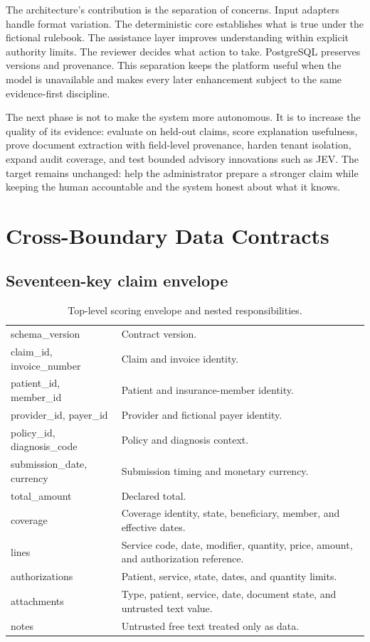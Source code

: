 \documentclass[11pt,a4paper,oneside]{report}
\begin{document}
The architecture's contribution is the separation of concerns. Input adapters handle format variation. The deterministic core establishes what is true under the fictional rulebook. The assistance layer improves understanding within explicit authority limits. The reviewer decides what action to take. PostgreSQL preserves versions and provenance. This separation keeps the platform useful when the model is unavailable and makes every later enhancement subject to the same evidence-first discipline.

The next phase is not to make the system more autonomous. It is to increase the quality of its evidence: evaluate on held-out claims, score explanation usefulness, prove document extraction with field-level provenance, harden tenant isolation, expand audit coverage, and test bounded advisory innovations such as JEV. The target remains unchanged: help the administrator prepare a stronger claim while keeping the human accountable and the system honest about what it knows.

\appendix
\chapter{Cross-Boundary Data Contracts}

\section{Seventeen-key claim envelope}

\begin{table}[H]
\centering
\begin{tabularx}{\textwidth}{>{\ttfamily}p{42mm} X}
\toprule
schema\_version & Contract version.\\
claim\_id, invoice\_number & Claim and invoice identity.\\
patient\_id, member\_id & Patient and insurance-member identity.\\
provider\_id, payer\_id & Provider and fictional payer identity.\\
policy\_id, diagnosis\_code & Policy and diagnosis context.\\
submission\_date, currency & Submission timing and monetary currency.\\
total\_amount & Declared total.\\
coverage & Coverage identity, state, beneficiary, member, and effective dates.\\
lines & Service code, date, modifier, quantity, price, amount, and authorization reference.\\
authorizations & Patient, service, state, dates, and quantity limits.\\
attachments & Type, patient, service, date, document state, and untrusted text value.\\
notes & Untrusted free text treated only as data.\\
\bottomrule
\end{tabularx}
\caption{Top-level scoring envelope and nested responsibilities.}
\end{table}
\end{document}
